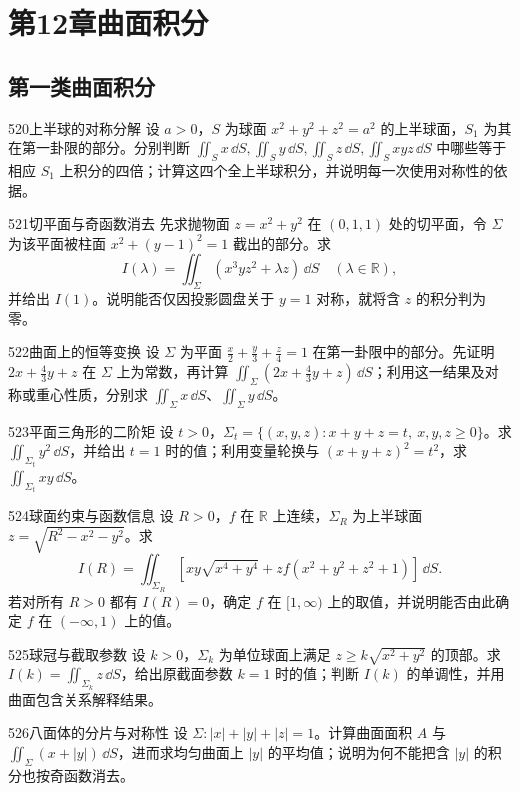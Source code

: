 \section{第12章\quad 曲面积分}
\subsection{第一类曲面积分}
\begin{exercise}{520}{上半球的对称分解}
设 $a>0$，$S$ 为球面 $x^2+y^2+z^2=a^2$ 的上半球面，$S_1$ 为其在第一卦限的部分。分别判断 $\iint_Sx\,\dd S,\iint_Sy\,\dd S,\iint_Sz\,\dd S,\iint_Sxyz\,\dd S$ 中哪些等于相应 $S_1$ 上积分的四倍；计算这四个全上半球积分，并说明每一次使用对称性的依据。
\end{exercise}
\begin{exercise}{521}{切平面与奇函数消去}
先求抛物面 $z=x^2+y^2$ 在 $(0,1,1)$ 处的切平面，令 $\Sigma$ 为该平面被柱面 $x^2+(y-1)^2=1$ 截出的部分。求
\[I(\lambda)=\iint_{\Sigma}(x^3yz^2+\lambda z)\,\dd S\quad(\lambda\in\mathbb R),\]
并给出 $I(1)$。说明能否仅因投影圆盘关于 $y=1$ 对称，就将含 $z$ 的积分判为零。
\end{exercise}
\begin{exercise}{522}{曲面上的恒等变换}
设 $\Sigma$ 为平面 $\frac x2+\frac y3+\frac z4=1$ 在第一卦限中的部分。先证明 $2x+\frac43y+z$ 在 $\Sigma$ 上为常数，再计算 $\iint_{\Sigma}(2x+\frac43y+z)\,\dd S$；利用这一结果及对称或重心性质，分别求 $\iint_{\Sigma}x\,\dd S$、$\iint_{\Sigma}y\,\dd S$。
\end{exercise}
\begin{exercise}{523}{平面三角形的二阶矩}
设 $t>0$，$\Sigma_t=\{(x,y,z):x+y+z=t,\ x,y,z\ge0\}$。求 $\iint_{\Sigma_t}y^2\,\dd S$，并给出 $t=1$ 时的值；利用变量轮换与 $(x+y+z)^2=t^2$，求 $\iint_{\Sigma_t}xy\,\dd S$。
\end{exercise}
\begin{exercise}{524}{球面约束与函数信息}
设 $R>0$，$f$ 在 $\mathbb R$ 上连续，$\Sigma_R$ 为上半球面 $z=\sqrt{R^2-x^2-y^2}$。求
\[I(R)=\iint_{\Sigma_R}\left[xy\sqrt{x^4+y^4}+zf(x^2+y^2+z^2+1)\right]\,\dd S.\]
若对所有 $R>0$ 都有 $I(R)=0$，确定 $f$ 在 $[1,\infty)$ 上的取值，并说明能否由此确定 $f$ 在 $(-\infty,1)$ 上的值。
\end{exercise}
\begin{exercise}{525}{球冠与截取参数}
设 $k>0$，$\Sigma_k$ 为单位球面上满足 $z\ge k\sqrt{x^2+y^2}$ 的顶部。求 $I(k)=\iint_{\Sigma_k}z\,\dd S$，给出原截面参数 $k=1$ 时的值；判断 $I(k)$ 的单调性，并用曲面包含关系解释结果。
\end{exercise}
\begin{exercise}{526}{八面体的分片与对称性}
设 $\Sigma:|x|+|y|+|z|=1$。计算曲面面积 $A$ 与 $\iint_{\Sigma}(x+|y|)\,\dd S$，进而求均匀曲面上 $|y|$ 的平均值；说明为何不能把含 $|y|$ 的积分也按奇函数消去。
\end{exercise}
